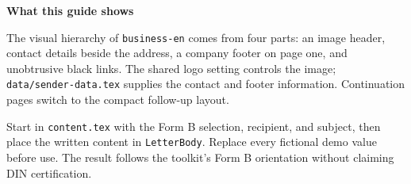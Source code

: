 
\UseFormTestBranding


\begin{LetterBody}

\textbf{What this guide shows}

The visual hierarchy of \texttt{business-en} comes from four parts: an image header, contact details beside the address, a company footer on page one, and unobtrusive black links. The shared logo setting controls the image; \texttt{data/sender-data.tex} supplies the contact and footer information. Continuation pages switch to the compact follow-up layout.

Start in \texttt{content.tex} with the Form B selection, recipient, and subject, then place the written content in \texttt{LetterBody}. Replace every fictional demo value before use. The result follows the toolkit's Form B orientation without claiming DIN certification.

\end{LetterBody}
